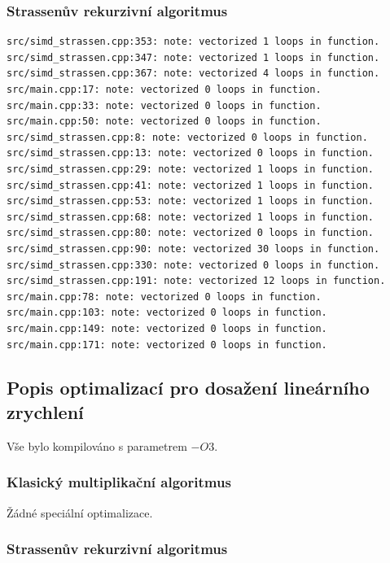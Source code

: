 \documentclass[12pt,a4paper]{article}
\begin{document}
\subsubsection{Strassenův rekurzivní algoritmus}

\begin{verbatim}
src/simd_strassen.cpp:353: note: vectorized 1 loops in function.
src/simd_strassen.cpp:347: note: vectorized 1 loops in function.
src/simd_strassen.cpp:367: note: vectorized 4 loops in function.
src/main.cpp:17: note: vectorized 0 loops in function.
src/main.cpp:33: note: vectorized 0 loops in function.
src/main.cpp:50: note: vectorized 0 loops in function.
src/simd_strassen.cpp:8: note: vectorized 0 loops in function.
src/simd_strassen.cpp:13: note: vectorized 0 loops in function.
src/simd_strassen.cpp:29: note: vectorized 1 loops in function.
src/simd_strassen.cpp:41: note: vectorized 1 loops in function.
src/simd_strassen.cpp:53: note: vectorized 1 loops in function.
src/simd_strassen.cpp:68: note: vectorized 1 loops in function.
src/simd_strassen.cpp:80: note: vectorized 0 loops in function.
src/simd_strassen.cpp:90: note: vectorized 30 loops in function.
src/simd_strassen.cpp:330: note: vectorized 0 loops in function.
src/simd_strassen.cpp:191: note: vectorized 12 loops in function.
src/main.cpp:78: note: vectorized 0 loops in function.
src/main.cpp:103: note: vectorized 0 loops in function.
src/main.cpp:149: note: vectorized 0 loops in function.
src/main.cpp:171: note: vectorized 0 loops in function.

\end{verbatim}



\subsection{Popis optimalizací pro dosažení lineárního zrychlení}

Vše bylo kompilováno s parametrem $-O3$.

\subsubsection{Klasický multiplikační algoritmus}

Žádné speciální optimalizace.


\subsubsection{Strassenův rekurzivní algoritmus}
\end{document}
